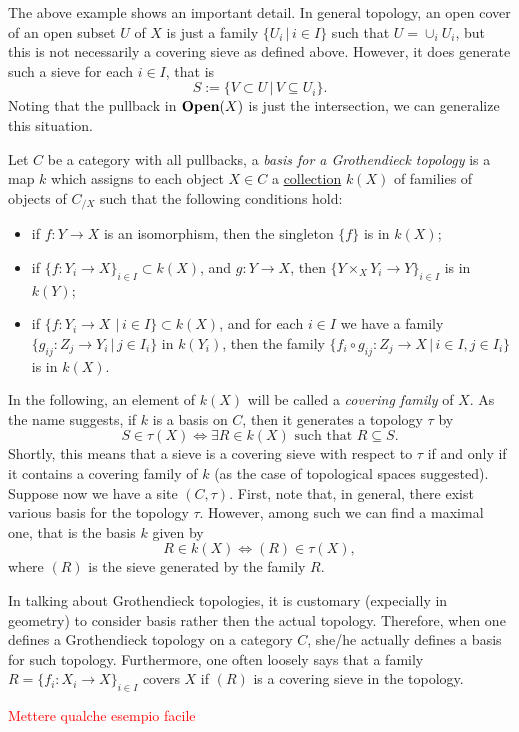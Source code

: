 The above example shows an important detail. In general topology, an open cover of an open subset $U$ of $X$ is just a family $\{U_i \, |\, i\in I\}$ such that $U=\cup_i U_i$, but this is not necessarily a covering sieve as defined above. However, it does generate such a sieve for each $i\in I$, that is 
\begin{equation*}
	S:=\{V\subset U \, | \, V\subseteq U_i\}.
\end{equation*}
Noting that the pullback in ${\normalfont\textbf{Open}}(X)$ is just the intersection, we can generalize this situation.
\begin{defi}\label{GTopBasis}
	Let $C$ be a category with all pullbacks, a \textit{basis for a Grothendieck topology} is a map $k$ which assigns to each object $X\in C$ a \underline{collection} $k(X)$ of families of objects of	 $C_{/X}$ such that the following conditions hold:
	\begin{itemize}[nosep]
		\item[(a)] if $f:Y\to X$ is an isomorphism, then the singleton $\{f\}$ is in $k(X)$; 
		\item[(b)] if $\{f:Y_i\to X\}_{i\in I}\subset k(X)$, and $g:Y\to X$, then $\{Y\times_X Y_i\to Y\}_{i\in I}$ is in $k(Y)$;
		\item[(c)] if $\{f:Y_i\to X\ \, | \, i\in I\}\subset k(X)$, and for each $i\in I$ we have a family $\{g_{ij}:Z_j\to Y_i\, | \, j\in I_i\}$ in $k(Y_i)$, then the family $\{f_i\circ g_{ij}:Z_j\to X\, | \, i\in I, j\in I_i\}$ is in $k(X)$.
	\end{itemize} 
\end{defi}
In the following, an element of $k(X)$ will be called a \textit{covering family} of $X$. As the name suggests, if $k$ is a basis on $C$, then it generates a topology $\tau$ by
\begin{equation*}
	S\in \tau(X)\iff \exists R\in k(X)\mbox{ such that }R\subseteq S.
\end{equation*} 
Shortly, this means that a sieve is a covering sieve with respect to $\tau$ if and only if it contains a covering family of $k$ (as the case of topological spaces suggested). Suppose now we have a site $(C,\tau)$. First, note that, in general, there exist various basis for the topology $\tau$. However, among such we can find a maximal one, that is the basis $k$ given by
\begin{equation*}
	R\in k(X)\iff (R)\in \tau(X),
\end{equation*}
where $(R)$ is the sieve generated by the family $R$.
\begin{rem}
	In talking about Grothendieck topologies, it is customary (expecially in geometry) to consider basis rather then the actual topology. Therefore, when one defines a Grothendieck topology on a category $C$, she/he actually defines a basis for such topology. Furthermore, one often loosely says that a family $R=\{f_i:X_i\to X\}_{i\in I}$ covers $X$ if $(R)$ is a covering sieve in the topology. 
\end{rem}
\textcolor{red}{Mettere qualche esempio facile}

